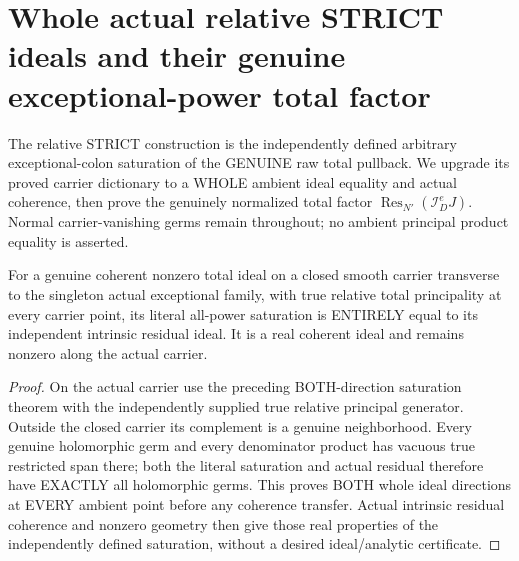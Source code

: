 \section{Whole actual relative STRICT ideals and their genuine exceptional-power total factor}

The relative STRICT construction is the independently defined arbitrary
exceptional-colon saturation of the GENUINE raw total pullback. We upgrade
its proved carrier dictionary to a WHOLE ambient ideal equality and actual
coherence, then prove the genuinely normalized total factor
$\operatorname{Res}_{N'}(\mathcal I_D^e J)$.
Normal carrier-vanishing germs remain throughout; no ambient principal
product equality is asserted.

\begin{lemma}
\label{hir:sharp-actual-single-strict-whole-ideal-equality}
\leanok
For a genuine coherent nonzero total ideal on a closed smooth carrier
transverse to the singleton actual exceptional family, with true relative
total principality at every carrier point, its literal all-power saturation
is ENTIRELY equal to its independent intrinsic residual ideal. It is a real
coherent ideal and remains nonzero along the actual carrier.
\end{lemma}
\begin{proof}
On the actual carrier use the preceding BOTH-direction saturation theorem
with the independently supplied true relative principal generator. Outside
the closed carrier its complement is a genuine neighborhood. Every genuine
holomorphic germ and every denominator product has vacuous true restricted
span there; both the literal saturation and actual residual therefore have
EXACTLY all holomorphic germs. This proves BOTH whole ideal directions at
EVERY ambient point before any coherence transfer. Actual intrinsic residual
coherence and nonzero geometry then give those real properties of the
independently defined saturation, without a desired ideal/analytic certificate.
\end{proof}

